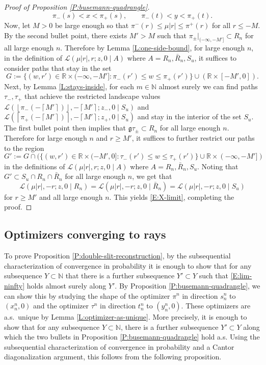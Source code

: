 \documentclass[11pt]{article}
\newcommand{\N}{\mathbb{N}}
\newcommand{\R}{\mathbb{R}}
\newcommand{\fl}[1]{{\left\lfloor #1 \right\rfloor}}
\newcommand{\cl}[1]{{\left\lceil #1 \right\rceil}}
\newcommand{\cL}{\mathcal{L}}
\newcommand{\X}{\times}
\theoremstyle{definition} %
\theoremstyle{remark} %
\begin{document}
\begin{proof}[Proof of Proposition \ref{P:busemann-quadrangle}]
	\begin{equation}
\pi_-(s) < x < \pi_+(s), \qquad  \pi_-(t) < y < \pi_+(t).
	\end{equation}
	Now, let $M > 0$ be large enough so that $\pi^-(r) \le \mu |r| \le \pi^+(r)$ for all $r \le -M$. By the second bullet point, there exists $M' > M$ such that $\pi_\pm|_{(-\infty, -M']} \subset R_n$ for all large enough $n$. Therefore by Lemma \ref{L:one-side-bound}, for large enough $n$, in the definition of 
	$
	\cL(\mu|r|, r; z, 0 \mid A)
	$
	where $A = R_n, \bar R_n, S_u$,
	it suffices to consider paths that stay in the set
	$$
	G := \{(w, r') \in \R \X (-\infty, -M'] : \pi_-(r') \le w \le \pi_+(r')\} \cup (\R\X [-M', 0]).
	$$
	Next, by Lemma \ref{L:stays-inside}, for each $m \in \N$ almost surely we can find paths $\tau_-, \tau_+$ that achieve the restricted landscape values
	$\cL(\fl{\pi_-(-\cl{M'})}, -\cl{M'}; z_-, 0 \mid S_u)$ and 	$\cL(\cl{\pi_+(-\cl{M'})}, -\cl{M'}; z_+, 0 \mid S_u)$ and stay in the interior of the set $S_u$. The first bullet point then implies that $\mathfrak{g} \tau_\pm \subset R_n$ for all large enough $n$. Therefore for large enough $n$ and $r \ge M'$, it suffices to further restrict our paths to the region
	$$
	G' := G \cap (\{(w, r') \in \R \X (-M', 0] : \tau_-(r') \le w \le \tau_+(r')\} \cup \R\X (-\infty, -M'])
	$$
	in the definitions of $
	\cL(\mu|r|, r; z, 0 \mid A)
	$
	where $A = R_n, \bar R_n, S_u$.
	Noting that $G' \subset S_u \cap R_n \cap \bar R_n$ for all large enough $n$, we get that 
	$$
	\cL(\mu|r|, -r; z, 0 \mid R_n) = \cL(\mu|r|, -r; z, 0 \mid \bar R_n)= \cL(\mu|r|, -r; z, 0 \mid S_u)
	$$
	for $r \ge M'$ and all large enough $n$. This yields \eqref{E:X-limit}, completing the proof.
\end{proof}

\subsection{Optimizers converging to rays}
\label{SS:optimizers-rays}

To prove Proposition \ref{P:double-slit-reconstruction}, by the subsequential characterization of convergence in probability it is enough to show that for any subsequence $Y \subset \N$ that there is a further subsequence $Y' \subset Y$ such that \eqref{E:lim-ninfty} holds almost surely along $Y'$. 
By Proposition \ref{P:busemann-quadrangle}, we can show this by studying the shape of the optimizer $\pi^n$ in direction $s^n_n$ to $(x^n_n, 0)$ and the optimizer $\tau^n$ in direction $t^n_n$ to $(y^n_n, 0)$. These optimizers are a.s.\ unique by Lemma \ref{L:optimizer-as-unique}. More precisely, it is enough to show that for any subsequence $Y \subset \N$, there is a further subsequence $Y' \subset Y$ along which the two bullets in Proposition \ref{P:busemann-quadrangle} hold a.s. Using the subsequential characterization of convergence in probability and a Cantor diagonalization argument, this follows from the following proposition.
\end{document}
